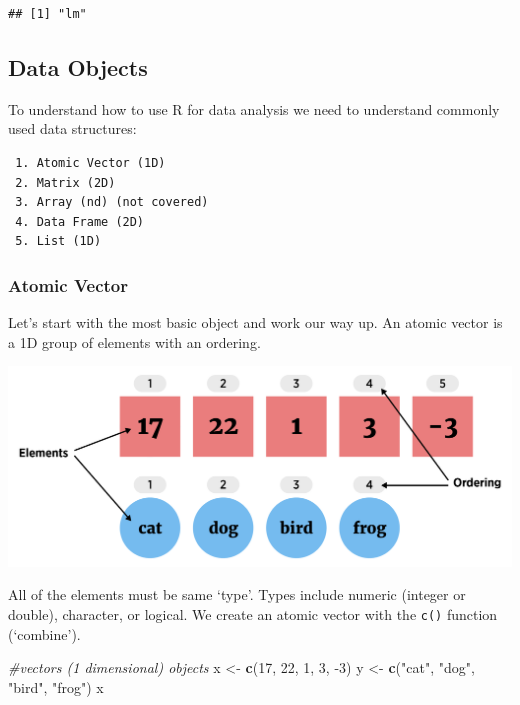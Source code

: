 \documentclass[
]{book}
\newenvironment{Shaded}{\begin{snugshade}}{\end{snugshade}}
\newcommand{\CommentTok}[1]{\textcolor[rgb]{0.56,0.35,0.01}{\textit{#1}}}
\newcommand{\DecValTok}[1]{\textcolor[rgb]{0.00,0.00,0.81}{#1}}
\newcommand{\KeywordTok}[1]{\textcolor[rgb]{0.13,0.29,0.53}{\textbf{#1}}}
\newcommand{\NormalTok}[1]{#1}
\newcommand{\StringTok}[1]{\textcolor[rgb]{0.31,0.60,0.02}{#1}}
\theoremstyle{definition}
\theoremstyle{definition}
\theoremstyle{definition}
\theoremstyle{remark}
\begin{document}
\begin{verbatim}
## [1] "lm"
\end{verbatim}

\hypertarget{data-objects-1}{%
\subsection{Data Objects}\label{data-objects-1}}

To understand how to use R for data analysis we need to understand commonly used data structures:

\begin{verbatim}
 1. Atomic Vector (1D)  
 2. Matrix (2D)  
 3. Array (nd) (not covered)  
 4. Data Frame (2D)  
 5. List (1D)  
\end{verbatim}

\hypertarget{atomic-vector-1}{%
\subsubsection{Atomic Vector}\label{atomic-vector-1}}

Let's start with the most basic object and work our way up. An atomic vector is a 1D group of elements with an ordering.

\begin{center}\includegraphics[width=0.8\linewidth]{img/vectorVisualF} \end{center}

All of the elements must be same `type'. Types include numeric (integer or double), character, or logical. We create an atomic vector with the \texttt{c()} function (`combine').

\begin{Shaded}
\begin{Highlighting}[]
\CommentTok{#vectors (1 dimensional) objects}
\NormalTok{x <-}\StringTok{ }\KeywordTok{c}\NormalTok{(}\DecValTok{17}\NormalTok{, }\DecValTok{22}\NormalTok{, }\DecValTok{1}\NormalTok{, }\DecValTok{3}\NormalTok{, }\DecValTok{-3}\NormalTok{)}
\NormalTok{y <-}\StringTok{ }\KeywordTok{c}\NormalTok{(}\StringTok{"cat"}\NormalTok{, }\StringTok{"dog"}\NormalTok{, }\StringTok{"bird"}\NormalTok{, }\StringTok{"frog"}\NormalTok{)}
\NormalTok{x}
\end{Highlighting}
\end{Shaded}
\end{document}
